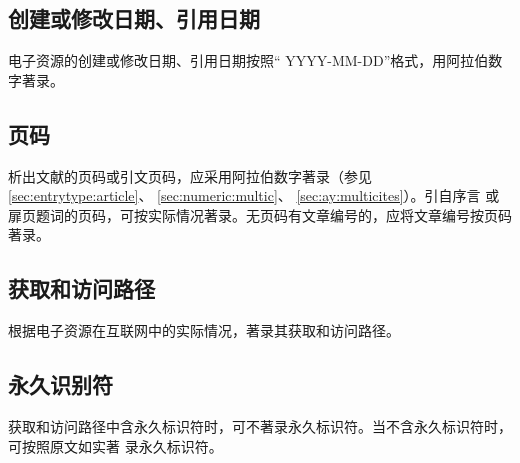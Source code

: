 \documentclass[twoside]{article}%
\begin{document}
\begin{refsection}

\nocite{egbookpubdated--}
\nocite{egbookpubdatee--}
\nocite{egbookpubdatef--}

{}
\end{refsection}




\subsection{创建或修改日期、引用日期}

电子资源的创建或修改日期、引用日期按照“ YYYY-MM-DD”格式，用阿拉伯数字著录。
\begin{refsection}
\nocite{egbookpubdateg--}

{}
\end{refsection}

\subsection{页码}
析出文献的页码或引文页码，应采用阿拉伯数字著录（参见 \ref{sec:entrytype:article}、 \ref{sec:numeric:multic}、 \ref{sec:ay:multicites}）。引自序言
或扉页题词的页码，可按实际情况著录。无页码有文章编号的，应将文章编号按页码著录。

\begin{refsection}
\nocite{曹凌2011-19-}
\nocite{钱学森2001--}
\nocite{冯友兰2008--}
\nocite{李约瑟1991--}
\nocite{DUBAR2013--}
\nocite{MAURYA2023}

{\printbibliography[heading=none,env=exampleenv]}
\end{refsection}


\subsection{获取和访问路径}
根据电子资源在互联网中的实际情况，著录其获取和访问路径。

\begin{refsection}

\nocite{储大同2010-721-724,weiner2010-38}

{\printbibliography[heading=none,env=exampleenv]}
\end{refsection}

\subsection{永久识别符}
获取和访问路径中含永久标识符时，可不著录永久标识符。当不含永久标识符时，可按照原文如实著
录永久标识符。
\end{document}
